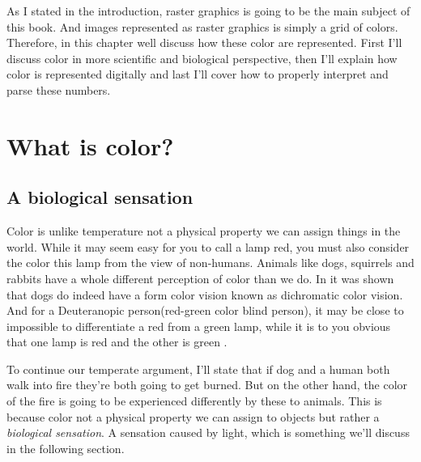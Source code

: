 


As I stated in the introduction, raster graphics is going to be the
main subject of this book. And images represented as raster graphics
is simply a grid of colors. Therefore, in this chapter well discuss
how these color are represented. First I'll discuss color in more
scientific and biological perspective, then I'll explain how color is
represented digitally and last I'll cover how to properly interpret
and parse these numbers.

\section{What is color?}

\subsection{A biological sensation}

\newcommand{\bluewave}{\ensuremath{\SI{400}{\nano\meter}}}

Color is unlike temperature not a physical property we can assign
things in the world. While it may seem easy for you to call a lamp
red, you must also consider the color this lamp from the view of
non-humans. Animals like dogs, squirrels and rabbits have a whole
different perception of color than we do. In \cite{dog_color_vision}
it was shown that dogs do indeed have a form color vision known as
dichromatic color vision. And for a Deuteranopic person(red-green
color blind person), it may be close to impossible to differentiate a
red from a green lamp, while it is to you obvious that one lamp is red
and the other is green
\cite{thompson:ways_of_coloring,schanda97:_colorimetry}.

To continue our temperate argument, I'll state that if dog and a human
both walk into fire they're both going to get burned. But on the other
hand, the color of the fire is going to be experienced differently by
these to animals. This is because color not a physical property we can
assign to objects but rather a \textit{biological
  sensation}\cite{boutel:_png_portab_networ_graph_specif_version12}. A
sensation caused by light, which is something we'll discuss in the
following section.

